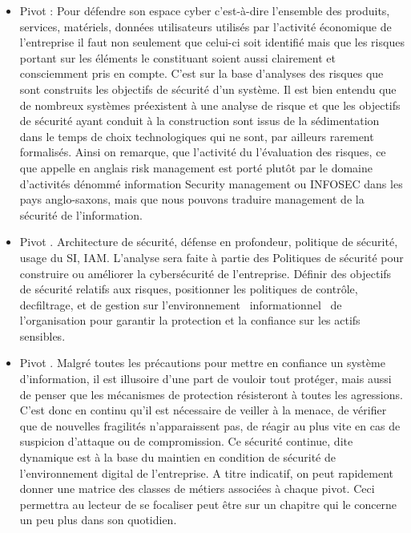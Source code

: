 \begin{itemize}
\item Pivot  : Pour défendre son espace  cyber  c'est-à-dire l'ensemble des produits, services, matériels, données utilisateurs utilisés par l'activité  économique de l'entreprise il faut non seulement que celui-ci soit identifié mais que les risques portant sur les éléments le constituant soient aussi clairement et consciemment pris en compte. C'est sur la base d'analyses des risques que sont construits les objectifs de sécurité d'un système. Il est bien entendu que de nombreux systèmes préexistent à une analyse de risque et que les objectifs de sécurité ayant conduit à la construction sont issus de  la sédimentation dans le temps de choix technologiques qui ne sont, par ailleurs rarement formalisés. Ainsi on remarque, que l'activité du l'évaluation des risques, ce que appelle en anglais  risk management  est porté plutôt par le domaine d'activités dénommé  information Security management  ou INFOSEC dans les pays anglo-saxons, mais que nous pouvons traduire  management de la sécurité de l'information.
\item Pivot  . Architecture de sécurité, défense en profondeur, politique de sécurité, usage du SI, IAM. L'analyse sera faite à partie des Politiques de sécurité pour construire ou améliorer la cybersécurité de l'entreprise. Définir des objectifs de sécurité relatifs aux risques,  positionner les politiques de contrôle, decfiltrage, et de gestion sur l'environnement  informationnel  de  l'organisation pour garantir la protection et la confiance sur les actifs sensibles. 
\item  Pivot  . Malgré toutes les précautions pour mettre en confiance un système d'information, il est illusoire d'une part de vouloir tout protéger, mais aussi de penser que les mécanismes de  protection résisteront à toutes les agressions. C'est donc en continu qu'il est nécessaire de veiller à la menace, de vérifier que de nouvelles fragilités n'apparaissent pas, de réagir au plus vite en cas de suspicion d'attaque ou de compromission.  Ce sécurité continue, dite dynamique est à la base du maintien en condition de sécurité de l'environnement digital de l'entreprise. 
A titre indicatif, on peut rapidement donner une matrice des classes de métiers associées à chaque pivot. Ceci permettra au lecteur de se focaliser peut être sur un chapitre qui le concerne un peu plus dans son quotidien.
\end{itemize}



